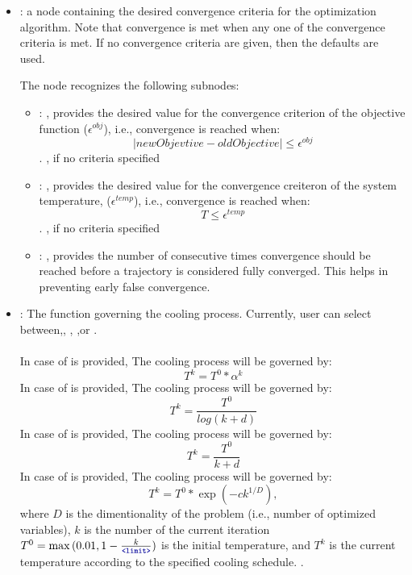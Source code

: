 \begin{itemize}
    \item {}:
      a node containing the desired convergence criteria for the optimization algorithm.
      Note that convergence is met when any one of the convergence criteria is met. If no
      convergence               criteria are given, then the defaults are used.

      The  node recognizes the following subnodes:
      \begin{itemize}
        \item {}: ,
          provides the desired value for the convergence criterion of the objective function
          ($\epsilon^{obj}$), i.e., convergence is reached when: $$ |newObjevtive - oldObjective|
          \le \epsilon^{obj}$$.                        , if no criteria specified

        \item {}: ,
          provides the desired value for the convergence creiteron of the system temperature,
          ($\epsilon^{temp}$), i.e., convergence is reached when: $$T \le \epsilon^{temp}$$.
          , if no criteria specified

        \item {}: ,
          provides the number of consecutive times convergence should be reached before a trajectory
          is considered fully converged. This helps in preventing early false convergence.
      \end{itemize}

    \item {}:
      The function governing the cooling process. Currently, user can select
      between,,                  ,
      ,or .\\ \\In case of  is
      provided, The cooling process will be governed by: $$ T^{k} = T^0 * \alpha^k$$
      In case of  is provided, The cooling process will be governed by: $$
      T^{k} = \frac{T^0}{log(k + d)}$$                  In case of  is provided,
      The cooling process will be governed by: $$ T^{k} = \frac{T^0}{k + d}$$In case of
       is provided, The cooling process will be governed by: $$ T^{k} =  T^0 *
      \exp(-ck^{1/D}),$$                  where $D$ is the dimentionality of the problem (i.e.,
      number of optimized variables), $k$ is the number of the current iteration
      $T^{0} = \max{(0.01,1-\frac{k}{\xmlNode{limit}})}$ is the initial temperature, and $T^{k}$ is
      the current temperature                  according to the specified cooling schedule.
      .


\end{itemize}
